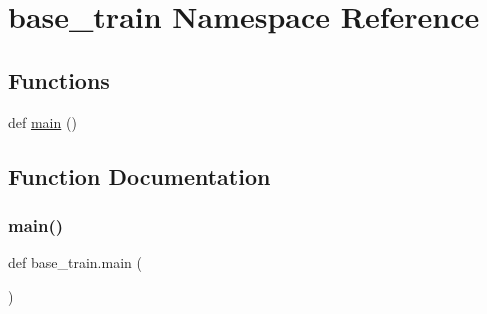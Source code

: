 \hypertarget{namespacebase__train}{}\section{base\+\_\+train Namespace Reference}
\label{namespacebase__train}
\subsection*{Functions}
\begin{DoxyCompactItemize}
\item 
def \hyperlink{namespacebase__train_afacf60925509c7e52f77f41e331261f3}{main} ()
\end{DoxyCompactItemize}


\subsection{Function Documentation}
\mbox{\label{namespacebase__train_afacf60925509c7e52f77f41e331261f3}} 
\subsubsection{\texorpdfstring{main()}{main()}}
{\footnotesize\ttfamily def base\+\_\+train.\+main (\begin{DoxyParamCaption}{ }\end{DoxyParamCaption})}

